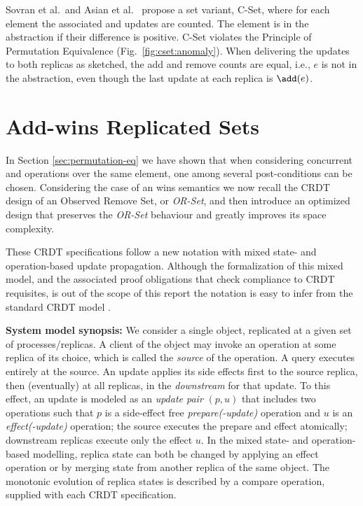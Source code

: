 \documentclass[a4paper]{article}
\begin{document}
Sovran et al.\ and Asian et al.\
\cite{rep:syn:1661,c-set2011} propose a set variant,
{C-Set},
where for each element the associated \add and \remove updates are counted.
The element is in the abstraction if their difference is positive.
C-Set violates the Principle of Permutation Equivalence
(Fig.~\ref{fig:cset:anomaly}).
When delivering the updates to both replicas as sketched, the add and remove counts are equal, i.e., $e$ is not in the abstraction, even though the last update at each replica is $\add(e)$.



\section{Add-wins Replicated Sets}

In Section \ref{sec:permutation-eq} we have shown that when considering
concurrent \add and \remove operations over the same element, one among
several post-conditions can be chosen. Considering the case of an \add wins
semantics we now recall \cite{syn:rep:sh143} 
the CRDT design of an
Observed Remove Set, or \emph{OR-Set}, and then introduce an optimized
design that preserves the \emph{OR-Set} behaviour and greatly improves its
space complexity. 

These CRDT specifications follow a new notation with mixed state- and
operation-based update propagation. Although the formalization of this mixed
model, and the associated proof obligations that check compliance to CRDT
requisites, is out of the scope of this report the notation is easy to infer
from the standard CRDT model 
\cite{syn:rep:sh143,rep:syn:sh138,syn:sh144}. 




{\bf System model synopsis:} We consider a single object, replicated at a
given set of processes/replicas. A client of the object may invoke an
operation at some replica of its choice, which is called the \emph{source}
of the operation.  A query executes entirely at the source.  An update
applies its side effects first to the source replica, then (eventually) at
all replicas, in the \emph{downstream} for that update. To this effect, an
update is modeled as an \emph{update pair} $(p,u)$ that includes two
operations such that $p$ is a side-effect free \emph{prepare(-update)}
operation and $u$ is an \emph{effect(-update)} operation; the source
executes the prepare and effect atomically; downstream replicas execute only
the effect $u$. In the mixed state- and operation-based modelling, replica
state can both be changed by applying an effect operation or by merging
state from another replica of the same object. The monotonic evolution of
replica states is described by a compare operation, supplied with each CRDT
specification.  
\end{document}
